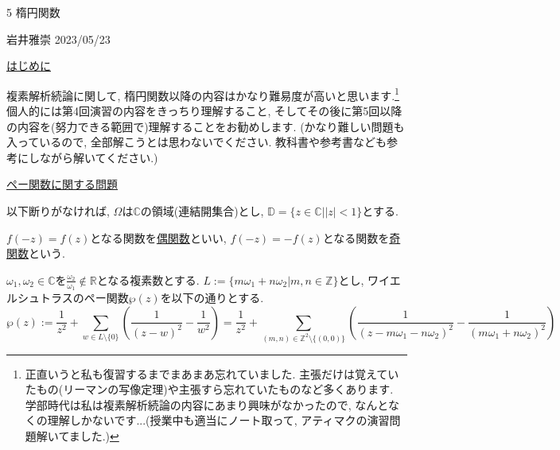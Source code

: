 \documentclass[dvipdfmx,a4paper,11pt]{article}
\newcommand{\R}{\mathbb{R}}
\newcommand{\Z}{\mathbb{Z}}
\newcommand{\C}{\mathbb{C}}
\newcommand{\D}{\mathbb{D}}
\theoremstyle{definition}
\begin{document}

\begin{center}
{\Large 5 楕円関数}
\end{center}

\begin{flushright}
 岩井雅崇 2023/05/23
\end{flushright}

\vspace{12pt}
\hspace{-24pt}\underline{はじめに}

\hspace{-12pt}複素解析続論に関して, 楕円関数以降の内容はかなり難易度が高いと思います.\footnote{正直いうと私も復習するまでまあまあ忘れていました. 主張だけは覚えていたもの(リーマンの写像定理)や主張すら忘れていたものなど多くあります. 学部時代は私は複素解析続論の内容にあまり興味がなかったので, なんとなくの理解しかないです...(授業中も適当にノート取って, アティマクの演習問題解いてました.) }
個人的には第4回演習の内容をきっちり理解すること, そしてその後に第5回以降の内容を(努力できる範囲で)理解することをお勧めします. (かなり難しい問題も入っているので, 全部解こうとは思わないでください. 教科書や参考書なども参考にしながら解いてください.)


\vspace{12pt}
\hspace{-24pt}\underline{ペー関数に関する問題}

\hspace{-12pt}以下断りがなければ, $\Omega$は$\C$の領域(連結開集合)とし, $\D=\{z \in \C |  |z| <1\}$とする. 

\hspace{-12pt}%
$f(-z)=f(z)$となる関数を\underline{偶関数}といい, $f(-z)=-f(z)$となる関数を\underline{奇関数}という.

\hspace{-12pt}$\omega_1, \omega_2 \in \C$を$\frac{\omega_2}{\omega_1} \not \in \R$となる複素数とする. $L := \{ m\omega_1 + n \omega_2 | m,n\in \Z\}$とし, ワイエルシュトラスのペー関数$\wp(z)$を以下の通りとする. 
$$\wp(z) := \frac{1}{z^2} + \sum_{w \in L \setminus \{ 0\}}\left(\frac{1}{(z-w)^2} - \frac{1}{w^2}\right)
= \frac{1}{z^2} + \sum_{(m,n) \in  \Z^2 \setminus \{ (0,0)\}}\left(\frac{1}{(z-m\omega_1 - n \omega_2)^2} - \frac{1}{(m\omega_1 + n \omega_2)^2}\right)
$$
\end{document}
